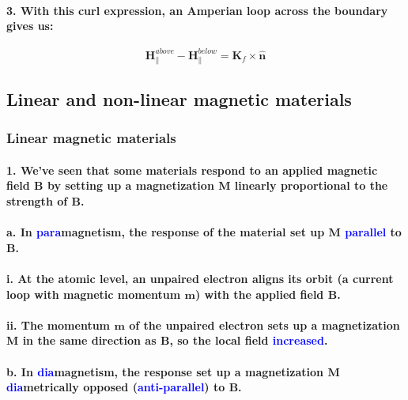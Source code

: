 \documentclass{article}
\begin{document}
\paragraph{3. With this curl expression, an Amperian loop across the boundary gives us: }
\begin{equation*}
    \boldsymbol{H}_{\parallel}^{above}-\boldsymbol{H}_{\parallel}^{below}=\boldsymbol{K}_f\times\hat{\boldsymbol{n}}
\end{equation*}
\subsection{Linear and non-linear magnetic materials}
\subsubsection{Linear magnetic materials}
\paragraph{1. We've seen that some materials respond to an applied magnetic field $\boldsymbol{B}$ by setting up a magnetization $\boldsymbol{M} $ linearly proportional to the strength of $\boldsymbol{B}$.}
\paragraph{\indent a. In \textcolor{blue}{para}magnetism, the response of the material set up $\boldsymbol{M}$ \textcolor{blue}{parallel} to $\boldsymbol{B}$.}
\paragraph{\indent \indent i. At the atomic level, an unpaired electron aligns its orbit (a current loop with magnetic momentum $\boldsymbol{m}$) with the applied field $\boldsymbol{B}$.}
\paragraph{\indent\indent ii. The momentum $\boldsymbol{m}$ of the unpaired electron sets up a magnetization $\boldsymbol{M}$ in the same direction as $\boldsymbol{B}$, so the local field \textcolor{blue}{increased}.}
\paragraph{\indent b. In \textcolor{blue}{dia}magnetism, the response set up a magnetization $\boldsymbol{M}$ \textcolor{blue}{dia}metrically opposed (\textcolor{blue}{anti-parallel}) to $\boldsymbol{B}$.}
\end{document}
